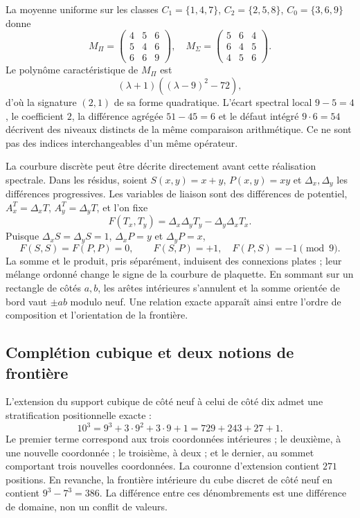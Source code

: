 La moyenne uniforme sur les classes \(C_1=\{1,4,7\}\), \(C_2=\{2,5,8\}\), \(C_0=\{3,6,9\}\) donne
\[
 M_\Pi=\begin{pmatrix}4&5&6\\5&4&6\\6&6&9\end{pmatrix},\quad
 M_\Sigma=\begin{pmatrix}5&6&4\\6&4&5\\4&5&6\end{pmatrix}.
\]
Le polynôme caractéristique de \(M_\Pi\) est
\[
 (\lambda+1)((\lambda-9)^2-72),
\]
d’où la signature \((2,1)\) de sa forme quadratique. L’écart spectral local \(9-5=4\), le coefficient \(2\), la différence agrégée \(51-45=6\) et le défaut intégré \(9\cdot6=54\) décrivent des niveaux distincts de la même comparaison arithmétique. Ce ne sont pas des indices interchangeables d’un même opérateur.

La courbure discrète peut être décrite directement avant cette réalisation spectrale. Dans les résidus, soient \(S(x,y)=x+y\), \(P(x,y)=xy\) et \(\Delta_x,\Delta_y\) les différences progressives. Les variables de liaison sont des différences de potentiel, \(A_x^T=\Delta_xT\), \(A_y^T=\Delta_yT\), et l’on fixe
\[
 F(T_x,T_y)=\Delta_x\Delta_yT_y-\Delta_y\Delta_xT_x.
\]
Puisque \(\Delta_xS=\Delta_yS=1\), \(\Delta_xP=y\) et \(\Delta_yP=x\),
\begin{equation}
 F(S,S)=F(P,P)=0,\qquad F(S,P)=+1,\quad F(P,S)=-1\pmod9.
\end{equation}
La somme et le produit, pris séparément, induisent des connexions plates ; leur mélange ordonné change le signe de la courbure de plaquette. En sommant sur un rectangle de côtés \(a,b\), les arêtes intérieures s’annulent et la somme orientée de bord vaut \(\pm ab\) modulo neuf. Une relation exacte apparaît ainsi entre l’ordre de composition et l’orientation de la frontière.

\subsection{Complétion cubique et deux notions de frontière}

L’extension du support cubique de côté neuf à celui de côté dix admet une stratification positionnelle exacte :
\begin{equation}
 10^3=9^3+3\cdot9^2+3\cdot9+1=729+243+27+1.
 \label{eq:cubo}
\end{equation}
Le premier terme correspond aux trois coordonnées intérieures ; le deuxième, à une nouvelle coordonnée ; le troisième, à deux ; et le dernier, au sommet comportant trois nouvelles coordonnées. La couronne d’extension contient \(271\) positions. En revanche, la frontière intérieure du cube discret de côté neuf en contient \(9^3-7^3=386\). La différence entre ces dénombrements est une différence de domaine, non un conflit de valeurs.

